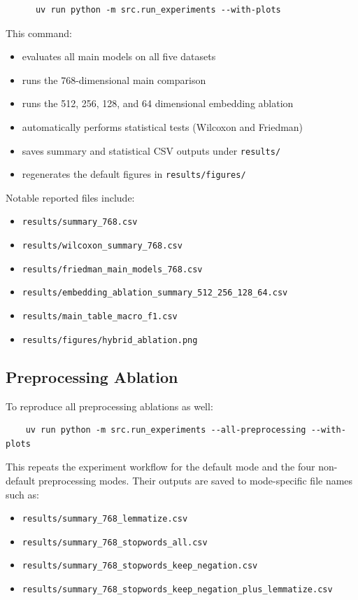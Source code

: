 \documentclass[10pt,a4paper]{article}
\begin{document}
\begin{verbatim}
      uv run python -m src.run_experiments --with-plots
\end{verbatim}
This command:
\begin{itemize}
    \item evaluates all main models on all five datasets
    \item runs the 768-dimensional main comparison
    \item runs the 512, 256, 128, and 64 dimensional embedding ablation
    \item automatically performs statistical tests (Wilcoxon and Friedman)
    \item saves summary and statistical CSV outputs under \texttt{results/}
    \item regenerates the default figures in \texttt{results/figures/}
\end{itemize}
Notable reported files include:
\begin{itemize}
    \item \texttt{results/summary\_768.csv}
    \item \texttt{results/wilcoxon\_summary\_768.csv}
    \item \texttt{results/friedman\_main\_models\_768.csv}
    \item \texttt{results/embedding\_ablation\_summary\_512\_256\_128\_64.csv}
    \item \texttt{results/main\_table\_macro\_f1.csv}
    \item \texttt{results/figures/hybrid\_ablation.png}
\end{itemize}


\subsection{Preprocessing Ablation}
To reproduce all preprocessing ablations as well:

\begin{verbatim}
    uv run python -m src.run_experiments --all-preprocessing --with-plots
\end{verbatim}

This repeats the experiment workflow for the default mode and the four non-default preprocessing modes. Their outputs are saved to mode-specific file names such as:
\begin{itemize}
    \item \texttt{results/summary\_768\_lemmatize.csv}
    \item \texttt{results/summary\_768\_stopwords\_all.csv}
    \item \texttt{results/summary\_768\_stopwords\_keep\_negation.csv}
    \item \texttt{results/summary\_768\_stopwords\_keep\_negation\_plus\_lemmatize.csv}
\end{itemize}
\end{document}

